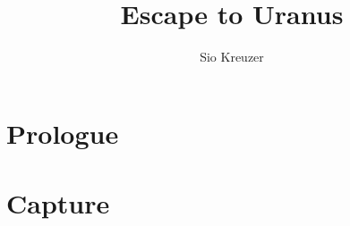 \documentclass[a5paper]{report}%
\author{Sio Kreuzer}
\title{Escape to Uranus}
\begin{document}
\chapter{Prologue}


\chapter{Capture}


\end{document}
